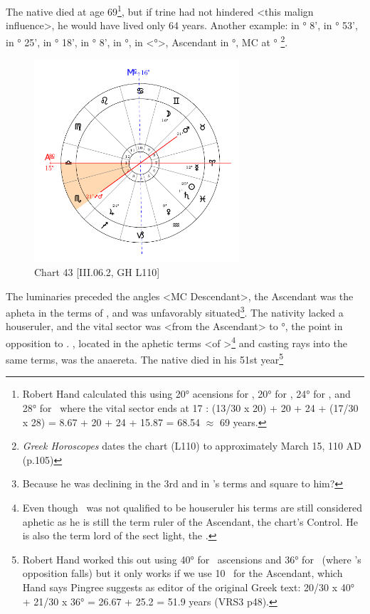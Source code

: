 \newpage
The native died at age 69\footnote{Robert Hand calculated this using 20° acensions for \Pisces,  20° for \Aries, 24° for \Taurus, and 28° for \Gemini\, where the vital sector ends at 17 \Gemini: (13/30 x 20) + 20 + 24 + (17/30 x 28) = 8.67 + 20 + 24 + 15.87 = 68.54 $\approx$ 69 years.}, but if \Jupiter\xspace trine had not hindered <this malign influence>, he would have lived only 64 years.
\newpage
Another example: \Sun\xspace in \Pisces\xspace 25° 8', \Moon\xspace in \Gemini\xspace 16° 53', \Saturn\xspace in \Pisces\xspace 1° 25', \Jupiter\xspace in
\Sagittarius\xspace 24° 18', \Mars\xspace in \Taurus\xspace 21° 8', \Venus\xspace in \Aquarius\xspace 9°, \Mercury\xspace in <°>, Ascendant in \Libra\xspace 15°, MC at \Cancer\xspace 16°
\footnote{\textit{Greek Horoscopes} dates the chart (L110) to approximately March 15, 110 AD (p.105)}.  

\clearpage
\begin{figure}
\centering
\vspace{-20pt}
\includegraphics[width=0.68\textwidth]{charts/3_06_2}
\caption{Chart 43 [III.06.2, GH L110]}
\label{fig:chart43}
\end{figure} 

The luminaries preceded the angles <MC Descendant>, the Ascendant was the apheta in the terms of \Jupiter, and \Jupiter\xspace was unfavorably situated\footnote{Because he was declining in the 3rd and in \Saturn's terms and square to him?}. The nativity lacked a houseruler, and the vital sector was <from the Ascendant> to \Scorpio\xspace 21°, the point in opposition to \Mars. \Mars, located in the aphetic terms <of \Jupiter>\footnote{Even though \Jupiter\, was not qualified to be houseruler his terms are still considered aphetic as he is still the term ruler of the Ascendant, the chart's Control. He is also the term lord of the sect light, the \Moon.} and casting rays into the same terms, was the anaereta. The native died in his 51st year\footnote{Robert Hand worked this out using 40° for \Libra\, ascensions and 36° for \Scorpio\, (where \Mars's opposition falls) but it only works if we use 10 \Libra\, for the Ascendant, which Hand says Pingree suggests as editor of the original Greek text: 20/30 x 40° + 21/30 x 36° = 26.67 + 25.2 = 51.9 years (VRS3 p48).}

